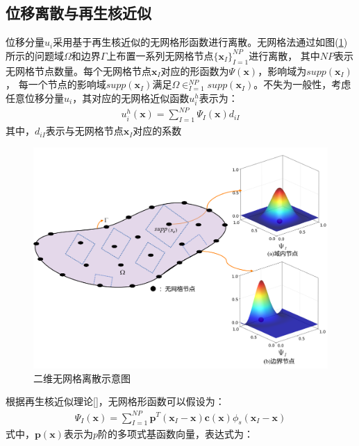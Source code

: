 \subsection{位移离散与再生核近似}
位移分量$u_i$采用基于再生核近似的无网格形函数进行离散。无网格法通过如图(\ref{PSI})所示的问题域$\Omega$和边界$\Gamma$上布置一系列无网格节点$\{\pmb{x}_I\}^{N\!P}_{I=1}$进行离散，
其中$N\!P$表示无网格节点数量。每个无网格节点$\pmb{x}_I$对应的形函数为$\Psi(\pmb{x})$，影响域为$supp(\pmb{x}_I)$，
每一个节点的影响域$supp(\pmb{x}_I)$满足$\Omega\in^{N\!P}_{I=1}supp(\pmb{x}_I)$。不失为一般性，考虑任意位移分量$u_i$，其对应的无网格近似函数$u^h_i$表示为：
\begin{equation}\label{ui}
\begin{split}
    u^h_i(\pmb{x})=\sum_{I=1}^{N\!P}\Psi_I(\pmb{x})d_{iI}
\end{split}
\end{equation}
其中，$d_{iI}$表示与无网格节点$\pmb{x}_I$对应的系数\par
\begin{figure}[!h]
    \centering
    \includegraphics[scale=0.5]{figure/PSI.png}
    \caption{二维无网格离散示意图}\label{PSI}
\end{figure}\newpage
根据再生核近似理论[]，无网格形函数可以假设为：
\begin{equation}\label{shapefunction}
\begin{split}
    \Psi_I(\pmb{x})=\sum_{I=1}^{N\!P}\pmb{p}^T(\pmb{x}_I-\pmb{x})\pmb{c}(\pmb{x})\phi_s(\pmb{x}_I-\pmb{x})
\end{split}
\end{equation}
式中，$\pmb{p}(\pmb{x})$表示为$p$阶的多项式基函数向量，表达式为：
